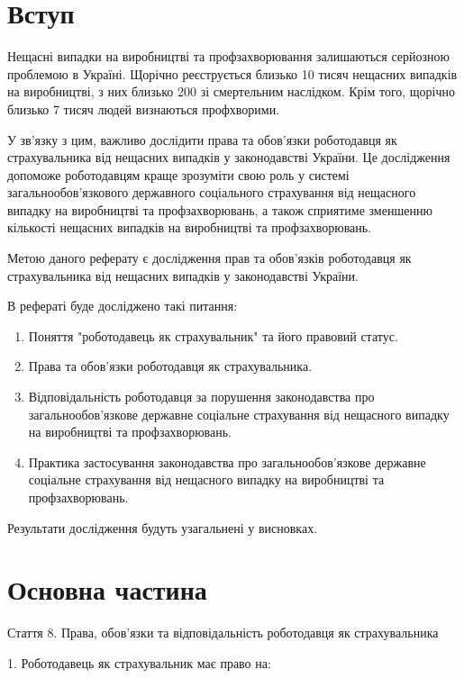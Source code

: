 \section*{Вступ}

Нещасні випадки на виробництві та профзахворювання залишаються серйозною проблемою в Україні. Щорічно реєструється близько 10 тисяч нещасних випадків на виробництві, з них близько 200 зі смертельним наслідком. Крім того, щорічно близько 7 тисяч людей визнаються профхворими.

У зв'язку з цим, важливо дослідити права та обов'язки роботодавця як страхувальника від нещасних випадків у законодавстві України. Це дослідження допоможе роботодавцям краще зрозуміти свою роль у системі загальнообов'язкового державного соціального страхування від нещасного випадку на виробництві та профзахворювань, а також сприятиме зменшенню кількості нещасних випадків на виробництві та профзахворювань.

Метою даного реферату є дослідження прав та обов'язків роботодавця як страхувальника від нещасних випадків у законодавстві України.

В рефераті буде досліджено такі питання:
\begin{enumerate}

    \item Поняття "роботодавець як страхувальник" та його правовий статус.

    \item Права та обов'язки роботодавця як страхувальника.

    \item Відповідальність роботодавця за порушення законодавства про загальнообов'язкове державне соціальне страхування від нещасного випадку на виробництві та профзахворювань.

    \item Практика застосування законодавства про загальнообов'язкове державне соціальне страхування від нещасного випадку на виробництві та профзахворювань.

\end{enumerate}
Результати дослідження будуть узагальнені у висновках.



\section*{Основна частина}
Стаття 8. Права, обов’язки та відповідальність роботодавця як страхувальника

1. Роботодавець як страхувальник має право на:

